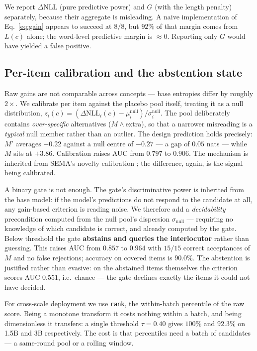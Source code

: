 \documentclass[11pt]{article}
\newcommand{\M}{\ensuremath{M}}
\newcommand{\Mp}{\ensuremath{M'}}
\begin{document}
We report $\Delta\text{NLL}$ (pure predictive power) and $G$ (with the length penalty)
separately, because their aggregate is misleading. A naive implementation of
Eq.~\ref{eq:gain} appears to succeed at $8/8$, but $92\%$ of that margin comes from $L(c)$
alone; the word-level predictive margin is $\approx 0$. Reporting only $G$ would have
yielded a false positive.

\subsection{Per-item calibration and the abstention state}

Raw gains are not comparable across concepts --- base entropies differ by roughly $2\times$.
We calibrate per item against the placebo pool itself, treating it as a null distribution,
$z_i(c) = (\Delta\text{NLL}_i(c) - \mu_i^{\text{null}}) / \sigma_i^{\text{null}}$. The pool
deliberately contains \emph{over-specific} alternatives ($\M \wedge \text{extra}$), so that
a narrower misreading is a \emph{typical} null member rather than an outlier. The design
prediction holds precisely: \Mp{} averages $-0.22$ against a null centre of $-0.27$ --- a
gap of $0.05$ nats --- while \M{} sits at $+3.86$. Calibration raises AUC from $0.797$ to
$0.906$. The mechanism is inherited from SEMA's novelty calibration
\citep{wang2024sema}; the difference, again, is the signal being calibrated.

A binary gate is not enough. The gate's discriminative power is inherited from the base
model: if the model's predictions do not respond to the candidate at all, any gain-based
criterion is reading noise. We therefore add a \emph{decidability} precondition computed
from the null pool's dispersion $\sigma_{\text{null}}$ --- requiring no knowledge of which
candidate is correct, and already computed by the gate. Below threshold the gate
\textbf{abstains and queries the interlocutor} rather than guessing. This raises AUC from
$0.857$ to $0.964$ with $15/15$ correct acceptances of \M{} and no false rejections;
accuracy on covered items is $90.0\%$. The abstention is justified rather than evasive: on
the abstained items themselves the criterion scores AUC $0.551$, i.e.\ chance --- the gate
declines exactly the items it could not have decided.

For cross-scale deployment we use \texttt{rank}, the within-batch percentile of the raw
score. Being a monotone transform it costs nothing within a batch, and being dimensionless
it transfers: a single threshold $\tau = 0.40$ gives $100\%$ and $92.3\%$ on 1.5B and 3B
respectively. The cost is that percentiles need a batch of candidates --- a same-round pool
or a rolling window.
\end{document}
